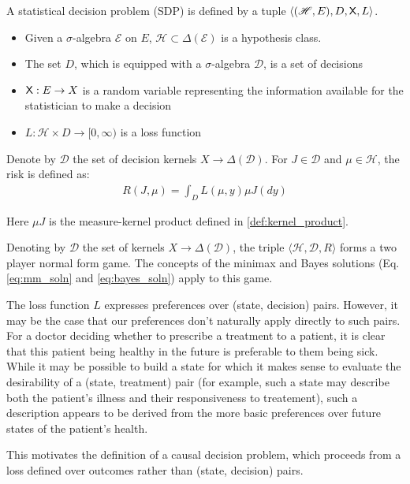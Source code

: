 \begin{definition}
A statistical decision problem (SDP) is defined by a tuple $\langle (\mathscr{H},E), D, \mathsf{X}, L\rangle$.
\begin{itemize}
    \item Given a $\sigma$-algebra $\mathcal{E}$ on $E$, $\mathscr{H}\subset\Delta(\mathcal{E})$ is a hypothesis class.
    \item The set $D$, which is equipped with a $\sigma$-algebra $\mathcal{D}$, is a set of decisions
    \item $\mathsf{X}:E\to X$ is a random variable representing the information available for the statistician to make a decision
    \item $L:\mathcal{H}\times D\to [0,\infty)$ is a loss function
\end{itemize}

Denote by $\mathscr{D}$ the set of decision kernels $X\to \Delta(\mathcal{D})$. For $J\in \mathscr{D}$ and $\mu\in \mathcal{H}$, the risk is defined as:
\begin{align}
    R(J,\mu) = \int_D L(\mu,y) \mu J(dy)
\end{align}

Here $\mu J$ is the measure-kernel product defined in \ref{def:kernel_product}.

Denoting by $\mathscr{D}$  the set of kernels $X\to \Delta(\mathcal{D})$, the triple $\langle \mathscr{H}, \mathscr{D}, R\rangle$ forms a two player normal form game. The concepts of the minimax and Bayes solutions (Eq. \ref{eq:mm_soln} and \ref{eq:bayes_soln}) apply to this game.
\end{definition}

The loss function $L$ expresses preferences over (state, decision) pairs. However, it may be the case that our preferences don't naturally apply directly to such pairs. For a doctor deciding whether to prescribe a treatment to a patient, it is clear that this patient being healthy in the future is preferable to them being sick. While it may be possible to build a state for which it makes sense to evaluate the desirability of a (state, treatment) pair (for example, such a state may describe both the patient's illness and their responsiveness to treatement), such a description appears to be derived from the more basic preferences over future states of the patient's health.

This motivates the definition of a causal decision problem, which proceeds from a loss defined over outcomes rather than (state, decision) pairs.

